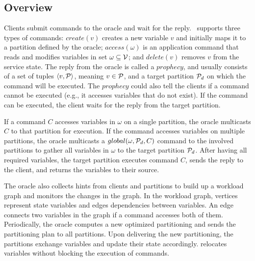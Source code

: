 
\subsection{Overview}
\label{sec:overview}

Clients submit commands to the oracle and wait for the reply. 
\dynastar\ supports three types of commands:
$create(v)$ creates a new variable $v$ and initially maps it to a partition defined by the oracle;
$access(\omega)$ is an application command that reads and modifies variables in set $\omega \subseteq \mathcal{V}$; and
$delete(v)$ removes $v$ from the service state.
The reply from the oracle is called a $prophecy$, and usually 
consists of a set of tuples $\langle v, \mathcal{P} \rangle$, meaning 
$v \in \mathcal{P}$, and a target partition $\mathcal{P}_d$ on which the command 
will be executed. The $prophecy$ could also tell the clients 
if a command cannot be executed (e.g., it accesses 
variables that do not exist). If the command can be executed, 
the client waits for the reply from the target partition.

If a command $C$ accesses variables in $\omega$ on a single partition, 
the oracle multicasts $C$ to that partition for execution. If the command 
accesses variables on multiple partitions, the oracle multicasts a 
$global(\omega,\mathcal{P}_d, C)$ command to the involved partitions to gather 
all variables in $\omega$ to the target partition $\mathcal{P}_d$. After having all 
required variables, the target partition executes command $C$, 
sends the reply to the client, and returns the variables to their source. 

The oracle also collects hints from clients and partitions to 
build up a workload graph and monitors the changes in the graph. 
In the workload graph, vertices represent state variables and edges dependencies between variables.
An edge connects two variables in the graph if a command accesses both of them.
Periodically, the oracle computes a new optimized partitioning and sends the partitioning plan to all partitions. 
Upon delivering the new partitioning, 
the partitions exchange variables and update their state accordingly.
\dynastar relocates variables without blocking the execution of commands.


